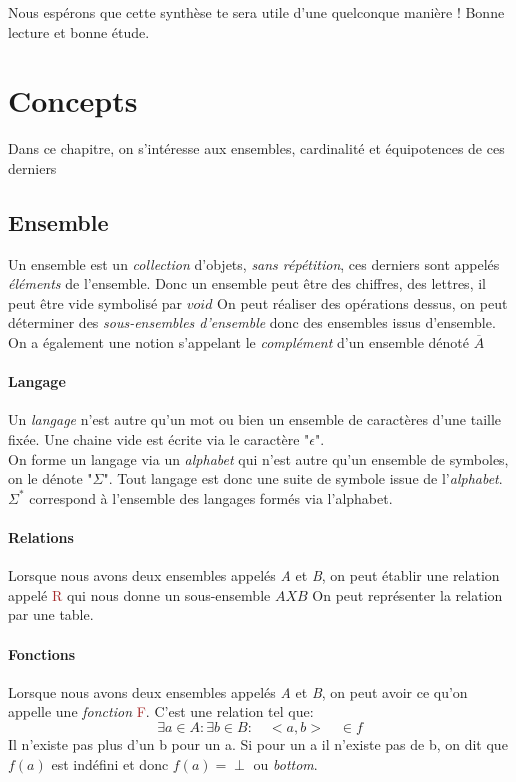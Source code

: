 \documentclass{report}
\begin{document}
Nous espérons que cette synthèse te sera utile d'une quelconque manière ! Bonne lecture et bonne étude.

\chapter{Concepts}
Dans ce chapitre, on s'intéresse aux ensembles, cardinalité et équipotences de ces derniers
\section{Ensemble}
Un ensemble est un \textit{collection} d'objets, \textit{sans répétition}, ces derniers sont appelés \textit{éléments} de l'ensemble.
Donc un ensemble peut être des chiffres, des lettres, il peut être vide symbolisé par $void$ %
On peut réaliser des opérations dessus, on peut déterminer des \textit{sous-ensembles d'ensemble} donc des ensembles issus d'ensemble.
On a également une notion s'appelant le \textit{complément} d'un ensemble dénoté $\overline{A}$\\%

\subsubsection{Langage}
Un \textit{langage} n'est autre qu'un mot ou bien un ensemble de caractères d'une taille fixée. Une chaine vide est écrite via le caractère "$\epsilon$".\\
On forme un langage via un \textit{alphabet} qui n'est autre qu'un ensemble de symboles, on le dénote "$\Sigma$". Tout langage est donc une suite de symbole issue de l'\textit{alphabet}.\\
$\Sigma^*$ correspond à l'ensemble des langages formés via l'alphabet.

\subsubsection{Relations}
Lorsque nous avons deux ensembles appelés \textit{A} et \textit{B}, on peut établir une relation appelé \textcolor{brown}{R} qui nous donne un sous-ensemble $AXB$ %
On peut représenter la relation par une table.

\subsubsection{Fonctions}
Lorsque nous avons deux ensembles appelés \textit{A} et \textit{B}, on peut avoir ce qu'on appelle une \textit{fonction} \textcolor{brown}{F}. C'est une relation tel que:
\begin{equation}
\exists a \in A : \exists b \in B :\quad <a,b> \quad \in f
\end{equation}
Il n'existe pas plus d'un b pour un a. Si pour un a il n'existe pas de b, on dit que $f(a)$ est indéfini et donc $f(a) = \perp$ ou \textit{bottom}.
\end{document}
